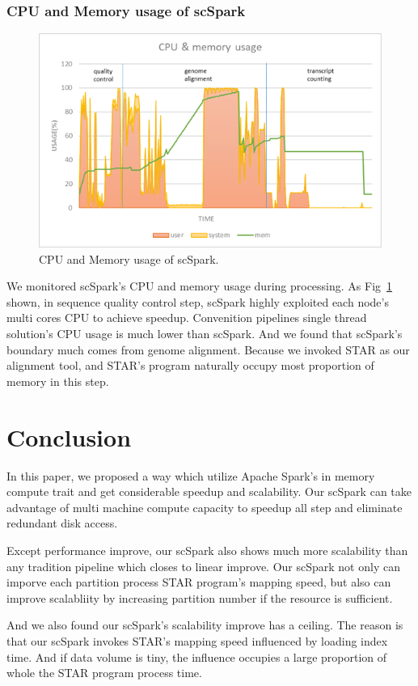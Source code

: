 \documentclass[runningheads]{llncs}
\begin{document}
\subsubsection{CPU and Memory usage of scSpark}
\begin{figure}
  \includegraphics[width=\textwidth]{fig8.png}
  \caption{CPU and Memory usage of scSpark.} \label{fig8}
\end{figure}
We monitored scSpark's CPU and memory usage during processing.
As Fig~\ref{fig8} shown, in sequence quality control step, scSpark highly exploited each node's multi cores CPU to achieve speedup.
Convenition pipelines single thread solution's CPU usage is much lower than scSpark.
And we found that scSpark's boundary much comes from genome alignment.
Because we invoked STAR as our alignment tool, and STAR's program naturally occupy most proportion of memory in this step.
\section{Conclusion}
In this paper, we proposed a way which utilize Apache Spark's in memory compute trait and get considerable speedup and scalability.
Our scSpark can take advantage of multi machine compute capacity to speedup all step and eliminate redundant disk access.

Except performance improve, our scSpark also shows much more scalability than any tradition pipeline which closes to linear improve.
Our scSpark not only can imporve each partition process STAR program's mapping speed, but also can improve scalabliity by increasing partition number if the resource is sufficient.

And we also found our scSpark's scalability improve has a ceiling.
The reason is that our scSpark invokes STAR's mapping speed influenced by loading index time.
And if data volume is tiny, the influence occupies a large proportion of whole the STAR program process time.
\end{document}
